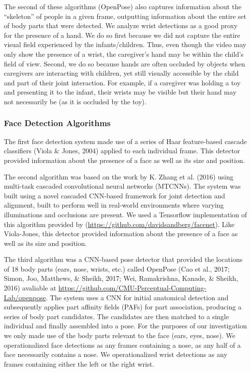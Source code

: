 \documentclass[10pt, letterpaper]{article}
\begin{document}
The second of these algorithms (OpenPose) also captures information
about the ``skeleton'' of people in a given frame, outputting
information about the entire set of body parts that were detected. We
analyze wrist detections as a good proxy for the presence of a hand. We
do so first because we did not capture the entire visual field
experienced by the infants/children. Thus, even though the video may
only show the presence of a wrist, the caregiver's hand may be within
the child's field of view. Second, we do so because hands are often
occluded by objects when caregivers are interacting with children, yet
still visually accessible by the child and part of their joint
interaction. For example, if a caregiver was holding a toy and
presenting it to the infant, their wrists may be visible but their hand
may not necessarily be (as it is occluded by the toy).

\subsubsection{Face Detection
Algorithms}\label{face-detection-algorithms}

The first face detection system made use of a series of Haar
feature-based cascade classifiers (Viola \& Jones, 2004) applied to each
individual frame. This detector provided information about the presence
of a face as well as its size and position.

The second algorithm was based on the work by K. Zhang et al. (2016)
using multi-task cascaded convolutional neural networks (MTCNNs). The
system was built using a novel cascaded CNN-based framework for joint
detection and alignment, built to perform well in real-world
environments where varying illuminations and occlusions are present. We
used a Tensorflow implementation of this algorithm provided by
(\url{https://github.com/davidsandberg/facenet}). Like Viola-Jones, this
detector provided information about the presence of a face as well as
its size and position.

The third algorithm was a CNN-based pose detector that provided the
locations of 18 body parts (ears, nose, wrists, etc.) called OpenPose
(Cao et al., 2017; Simon, Joo, Matthews, \& Sheikh, 2017; Wei,
Ramakrishna, Kanade, \& Sheikh, 2016) avaliable at
\url{https://github.com/CMU-Perceptual-Computing-Lab/openpose}. The
system uses a CNN for initial anatomical detection and subsequently
applies part affinity fields (PAFs) for part association, producing a
series of body part candidates. The candidates are then matched to a
single individual and finally assembled into a pose. For the purposes of
our investigation we only made use of the body parts relevant to the
face (ears, eyes, nose). We operationalized face detections as any
frames containing a nose, as any half of a face necessarily contains a
nose. We operationalized wrist detections as any frames containing
either the left or the right wrist.
\end{document}
